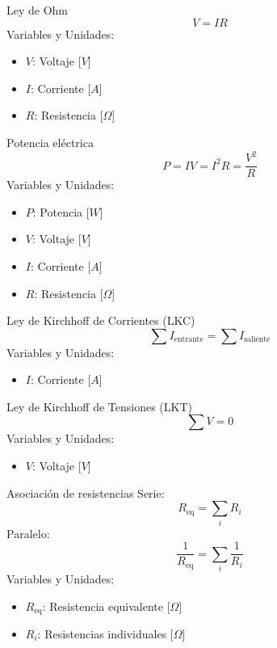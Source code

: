 \documentclass{article}
\begin{document}
\begin{multicols}{3}

\begin{teorema}{Ley de Ohm}
    $$V = I R$$
    Variables y Unidades:
    \begin{itemize}
        \item $V$: Voltaje [$V$]
        \item $I$: Corriente [$A$]
        \item $R$: Resistencia [$\Omega$]
    \end{itemize}
\end{teorema}

\begin{teorema}{Potencia eléctrica}
    $$P = I V = I^2 R = \frac{V^2}{R}$$
    Variables y Unidades:
    \begin{itemize}
        \item $P$: Potencia [$W$]
        \item $V$: Voltaje [$V$]
        \item $I$: Corriente [$A$]
        \item $R$: Resistencia [$\Omega$]
    \end{itemize}
\end{teorema}

\columnbreak

\begin{teorema}{Ley de Kirchhoff de Corrientes (LKC)}
    $$\sum I_{\text{entrante}} = \sum I_{\text{saliente}}$$
    Variables y Unidades:
    \begin{itemize}
        \item $I$: Corriente [$A$]
    \end{itemize}
\end{teorema}

\begin{teorema}{Ley de Kirchhoff de Tensiones (LKT)}
    $$\sum V = 0$$
    Variables y Unidades:
    \begin{itemize}
        \item $V$: Voltaje [$V$]
    \end{itemize}
\end{teorema}

\columnbreak

\begin{teorema}{Asociación de resistencias}
    Serie: $$R_{\text{eq}} = \sum_i R_i$$
    Paralelo: $$\frac{1}{R_{\text{eq}}} = \sum_i \frac{1}{R_i}$$
    Variables y Unidades:
    \begin{itemize}
        \item $R_{\text{eq}}$: Resistencia equivalente [$\Omega$]
        \item $R_i$: Resistencias individuales [$\Omega$]
    \end{itemize}
\end{teorema}


\end{multicols}
\end{document}
